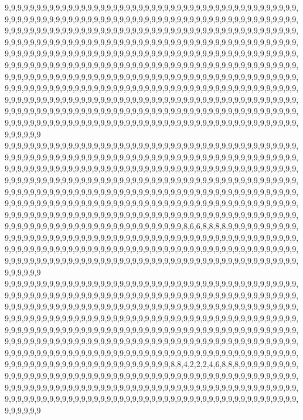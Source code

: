 9,9,9,9,9,9,9,9,9,9,9,9,9,9,9,9,9,9,9,9,9,9,9,9,9,9,9,9,9,9,9,9,9,9,9,9,9,9,9,9,9,9,9,9,9,9,9,9,9,9,9,9,9,9,9,9,9,9,9,9,9,9,9,9,9,9,9,9,9,9,9,9,9,9,9,9,9,9,9,9,9,9,9,9,9,9,9,9,9,9,9,9,9,9,9,9,9,9,9,9,9,9,9,9,9,9,9,9,9,9,9,9,9,9,9,9,9,9,9,9,9,9,9,9,9,9,9,9,9,9,9,9,9,9,9,9,9,9,9,9,9,9,9,9,9,9,9,9,9,9,9,9,9,9,9,9,9,9,9,9,9,9,9,9,9,9,9,9,9,9,9,9,9,9,9,9,9,9,9,9,9,9,9,9,9,9,9,9,9,9,9,9,9,9,9,9,9,9,9,9,9,9,9,9,9,9,9,9,9,9,9,9,9,9,9,9,9,9,9,9,9,9,9,9,9,9,9,9,9,9,9,9,9,9,9,9,9,9,9,9,9,9,9,9,9,9,9,9,9,9,9,9,9,9,9,9,9,9,9,9,9,9,9,9,9,9,9,9,9,9,9,9,9,9,9,9,9,9,9,9,9,9,9,9,9,9,9,9,9,9,9,9,9,9,9,9,9,9,9,9,9,9,9,9,9,9,9,9,9,9,9,9,9,9,9,9,9,9,9,9,9,9,9,9,9,9,9,9,9,9,9,9,9,9,9,9,9,9,9,9,9,9,9,9,9,9,9,9,9,9,9,9,9,9,9,9,9,9,9,9,9,9,9,9,9,9,9,9,9,9,9,9,9,9,9,9,9,9,9,9,9,9,9,9,9,9,9,9,9,9,9,9,9,9,9,9,9,9,9,9,9,9,9,9,9,9,9,9,9,9,9,9,9,9,9,9,9,9,9,9,9,9,9,9,9,9,9,9,9,9,9,9,9,9,9,9,9,9,9,9,9,9,9,9,9,9,9,9,9,9,9,9,9,9,9,9,9,9,9,9,9,9,9,9,9,9,9,9,9,9,9,9,9,9,9,9,9,9,9,9,9,9,9,9,9,9,9,9,9,9,9,9,9,9,9,9,9,9,9,9,9,9,9,9,9,9,9,9,9,9,9,9
9,9,9,9,9,9,9,9,9,9,9,9,9,9,9,9,9,9,9,9,9,9,9,9,9,9,9,9,9,9,9,9,9,9,9,9,9,9,9,9,9,9,9,9,9,9,9,9,9,9,9,9,9,9,9,9,9,9,9,9,9,9,9,9,9,9,9,9,9,9,9,9,9,9,9,9,9,9,9,9,9,9,9,9,9,9,9,9,9,9,9,9,9,9,9,9,9,9,9,9,9,9,9,9,9,9,9,9,9,9,9,9,9,9,9,9,9,9,9,9,9,9,9,9,9,9,9,9,9,9,9,9,9,9,9,9,9,9,9,9,9,9,9,9,9,9,9,9,9,9,9,9,9,9,9,9,9,9,9,9,9,9,9,9,9,9,9,9,9,9,9,9,9,9,9,9,9,9,9,9,9,9,9,9,9,9,9,9,9,9,9,9,9,9,9,9,9,9,9,9,9,9,9,9,9,9,9,9,9,9,9,9,9,9,9,9,9,9,9,9,9,9,9,9,9,9,9,9,9,9,9,9,9,9,9,9,9,9,9,9,9,9,9,9,9,9,9,9,9,9,9,9,9,9,9,9,9,9,9,9,9,9,9,9,9,9,9,9,9,9,9,9,9,9,9,9,9,9,9,9,9,9,9,9,9,9,9,9,9,9,9,9,9,9,9,9,9,9,9,9,9,9,9,9,9,9,9,9,9,9,9,9,9,9,9,9,9,9,9,9,9,9,9,9,9,9,9,9,9,9,9,9,9,9,9,9,9,9,9,9,9,9,9,9,9,9,9,9,9,9,8,6,6,8,8,8,8,9,9,9,9,9,9,9,9,9,9,9,9,9,9,9,9,9,9,9,9,9,9,9,9,9,9,9,9,9,9,9,9,9,9,9,9,9,9,9,9,9,9,9,9,9,9,9,9,9,9,9,9,9,9,9,9,9,9,9,9,9,9,9,9,9,9,9,9,9,9,9,9,9,9,9,9,9,9,9,9,9,9,9,9,9,9,9,9,9,9,9,9,9,9,9,9,9,9,9,9,9,9,9,9,9,9,9,9,9,9,9,9,9,9,9,9,9,9,9,9,9,9,9,9,9,9,9,9,9,9,9,9,9,9,9,9,9,9,9,9,9,9,9,9,9,9,9,9,9,9,9,9,9,9,9
9,9,9,9,9,9,9,9,9,9,9,9,9,9,9,9,9,9,9,9,9,9,9,9,9,9,9,9,9,9,9,9,9,9,9,9,9,9,9,9,9,9,9,9,9,9,9,9,9,9,9,9,9,9,9,9,9,9,9,9,9,9,9,9,9,9,9,9,9,9,9,9,9,9,9,9,9,9,9,9,9,9,9,9,9,9,9,9,9,9,9,9,9,9,9,9,9,9,9,9,9,9,9,9,9,9,9,9,9,9,9,9,9,9,9,9,9,9,9,9,9,9,9,9,9,9,9,9,9,9,9,9,9,9,9,9,9,9,9,9,9,9,9,9,9,9,9,9,9,9,9,9,9,9,9,9,9,9,9,9,9,9,9,9,9,9,9,9,9,9,9,9,9,9,9,9,9,9,9,9,9,9,9,9,9,9,9,9,9,9,9,9,9,9,9,9,9,9,9,9,9,9,9,9,9,9,9,9,9,9,9,9,9,9,9,9,9,9,9,9,9,9,9,9,9,9,9,9,9,9,9,9,9,9,9,9,9,9,9,9,9,9,9,9,9,9,9,9,9,9,9,9,9,9,9,9,9,9,9,9,9,9,9,9,9,9,9,9,9,9,9,9,9,9,9,9,9,9,9,9,9,9,9,9,9,9,9,9,9,9,9,9,9,9,9,9,9,9,9,9,9,9,9,9,9,9,9,9,9,9,9,9,9,9,9,9,9,9,9,9,9,9,9,9,9,9,9,9,9,9,9,9,9,9,9,9,9,9,9,9,9,9,9,9,9,9,9,9,8,8,4,2,2,2,4,6,8,8,8,9,9,9,9,9,9,9,9,9,9,9,9,9,9,9,9,9,9,9,9,9,9,9,9,9,9,9,9,9,9,9,9,9,9,9,9,9,9,9,9,9,9,9,9,9,9,9,9,9,9,9,9,9,9,9,9,9,9,9,9,9,9,9,9,9,9,9,9,9,9,9,9,9,9,9,9,9,9,9,9,9,9,9,9,9,9,9,9,9,9,9,9,9,9,9,9,9,9,9,9,9,9,9,9,9,9,9,9,9,9,9,9,9,9,9,9,9,9,9,9,9,9,9,9,9,9,9,9,9,9,9,9,9,9,9,9,9,9,9,9,9,9,9,9,9,9,9,9,9,9,9,9,9

